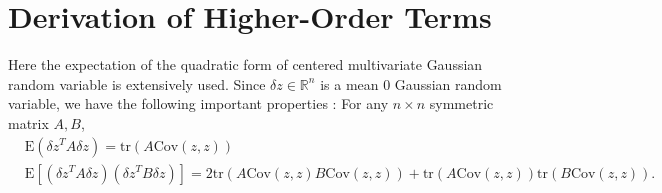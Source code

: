 \documentclass[article,ij4uq]{ij4uq}              %
\begin{document}
\section{Derivation of Higher-Order Terms} \label{s:hot}
\par Here the expectation of the quadratic form of centered multivariate Gaussian random variable is extensively used. Since $\delta z\in\mathbb{R}^{n}$ is a mean 0 Gaussian random variable, we have the following important properties \cite{brookes2005matrix}: For any $n\times n$ symmetric matrix $A,B$,
\begin{align}
    &\mathrm{E}(\delta z^{T}A\delta z)=\mathrm{tr}(A\mathrm{Cov}(z,z))\label{eqc1}\\
    &\mathrm{E}[(\delta z^{T}A\delta z)(\delta z^{T}B\delta z)]=2\mathrm{tr}(A\mathrm{Cov}(z,z)B\mathrm{Cov}(z,z))+\mathrm{tr}(A\mathrm{Cov}(z,z))\mathrm{tr}(B\mathrm{Cov}(z,z)).\label{eqc2}
\end{align}
\end{document}
